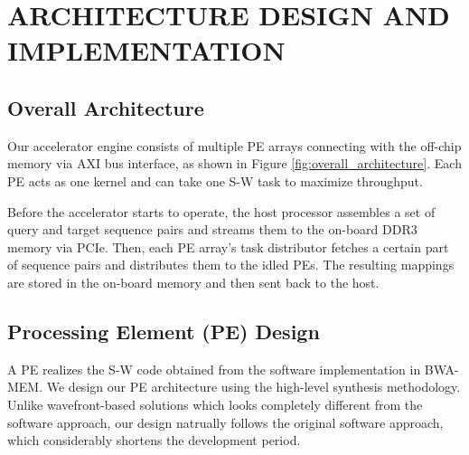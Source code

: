 \section{ARCHITECTURE DESIGN AND IMPLEMENTATION} 
\label{sec:architecture}
\subsection{Overall Architecture}

Our accelerator engine consists of multiple PE arrays connecting with the off-chip memory via AXI bus interface, as shown in Figure \ref{fig:overall_architecture}.
Each PE acts as one kernel and can take one S-W task to maximize throughput.

Before the accelerator starts to operate, the host processor assembles a set of query and target sequence pairs and streams them to the on-board DDR3 memory via PCIe. 
Then, each PE array's task distributor fetches a certain part of sequence pairs and distributes them to the idled PEs. 
The resulting mappings are stored in the on-board memory and then sent back to the host.
\subsection{Processing Element (PE) Design}
A PE realizes the S-W code obtained from the software implementation in BWA-MEM. 
We design our PE architecture using the high-level synthesis methodology. 
Unlike wavefront-based solutions which looks completely different from the software approach,  
our design natrually follows the original software approach, which considerably shortens the development period. 

